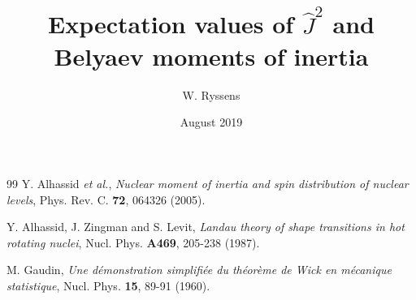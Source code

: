 \documentclass[print, amsmath,amssymb, aps,prc,nofootinbib,notitlepage]{revtex4-1}
\newcommand{\etal}{\emph{et al.}}
\begin{document}
\title{Expectation values of $\hat{J}^2$ and Belyaev moments of inertia} 

\author{W. Ryssens}
%
\date{August 2019}

\maketitle



\appendix



\begin{thebibliography}{99}
Y. Alhassid \etal, 
\emph{Nuclear moment of inertia and spin distribution of nuclear levels},
Phys. Rev. C. \textbf{72}, 064326 (2005).

Y. Alhassid, J. Zingman and S. Levit, 
\emph{Landau theory of shape transitions in hot rotating nuclei}, 
Nucl. Phys. \textbf{A469}, 205-238 (1987).

M. Gaudin,
\emph{Une d\'emonstration simplifi\'ee du th\'eor\`eme de Wick en m\'ecanique 
     statistique},
Nucl. Phys. \textbf{15}, 89-91 (1960).
\end{thebibliography}
\end{document}
